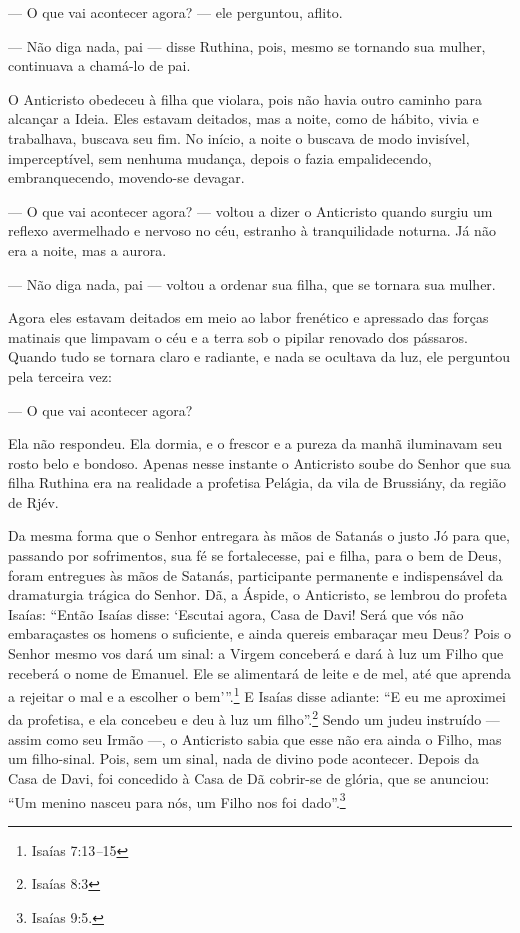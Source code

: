 --- O que vai acontecer agora? --- ele perguntou, aflito.

--- Não diga nada, pai --- disse Ruthina, pois, mesmo se tornando sua
mulher, continuava a chamá-lo de pai.

O Anticristo obedeceu à filha que violara, pois não havia outro caminho
para alcançar a Ideia. Eles estavam deitados, mas a noite, como de
hábito, vivia e trabalhava, buscava seu fim. No início, a noite o
buscava de modo invisível, imperceptível, sem nenhuma mudança, depois o
fazia empalidecendo, embranquecendo, movendo-se devagar.

--- O que vai acontecer agora? --- voltou a dizer o Anticristo quando
surgiu um reflexo avermelhado e nervoso no céu, estranho à tranquilidade
noturna. Já não era a noite, mas a aurora.

--- Não diga nada, pai --- voltou a ordenar sua filha, que se tornara
sua mulher.

Agora eles estavam deitados em meio ao labor frenético e apressado das
forças matinais que limpavam o céu e a terra sob o pipilar renovado dos
pássaros. Quando tudo se tornara claro e radiante, e nada se ocultava da
luz, ele perguntou pela terceira vez:

--- O que vai acontecer agora?

Ela não respondeu. Ela dormia, e o frescor e a pureza da manhã
iluminavam seu rosto belo e bondoso. Apenas nesse instante o Anticristo
soube do Senhor que sua filha Ruthina era na realidade a profetisa
Pelágia, da vila de Brussiány, da região de Rjév.

Da mesma forma que o Senhor entregara às mãos de Satanás o justo Jó para
que, passando por sofrimentos, sua fé se fortalecesse, pai e filha, para
o bem de Deus, foram entregues às mãos de Satanás, participante
permanente e indispensável da dramaturgia trágica do Senhor. Dã, a
Áspide, o Anticristo, se lembrou do profeta Isaías: ``Então Isaías
disse: `Escutai agora, Casa de Davi! Será que vós não embaraçastes os
homens o suficiente, e ainda quereis embaraçar meu Deus? Pois o Senhor
mesmo vos dará um sinal: a Virgem conceberá e dará à luz um Filho que
receberá o nome de Emanuel. Ele se alimentará de leite e de mel, até que
aprenda a rejeitar o mal e a escolher o bem'''.\footnote{Isaías
  7:13\emph{--}15} E Isaías disse adiante: ``E eu me aproximei da
profetisa, e ela concebeu e deu à luz um filho''.\footnote{Isaías 8:3}
Sendo um judeu instruído --- assim como seu Irmão ---, o Anticristo
sabia que esse não era ainda o Filho, mas um filho-sinal. Pois, sem um
sinal, nada de divino pode acontecer. Depois da Casa de Davi, foi
concedido à Casa de Dã cobrir-se de glória, que se anunciou: ``Um menino
nasceu para nós, um Filho nos foi dado''.\footnote{Isaías 9:5.}

